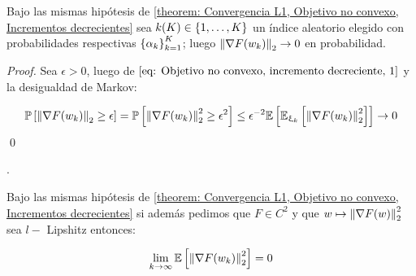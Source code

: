 \begin{corollary}
	Bajo las mismas hip\'otesis de \ref{theorem: Convergencia L1, Objetivo no convexo, Incrementos decrecientes} sea $k(K) \in \left\lbrace1, \dots, K\right\rbrace$ un \'indice aleatorio elegido con probabilidades respectivas $\left\lbrace\alpha_k\right\rbrace_{k=1}^K$; luego $\left\lVert\nabla F(w_k)\right\rVert_2 \rightarrow 0$ en probabilidad.
\end{corollary}

\begin{proof}
	Sea $\epsilon > 0$, luego de $\ref{eq: Objetivo no convexo, incremento decreciente, 1}$ y la desigualdad de Markov:
	
	
	\begin{equation*}
		\mathbb{P} \left[\left\lVert\nabla F (w_k)\right\rVert_2 \geq \epsilon\right] = \mathbb{P} \left[\left\lVert\nabla F (w_k)\right\rVert_2^2 \geq \epsilon^2\right] \leq \epsilon^{-2} \mathbb{E} \left[\mathbb{E}_{\upxi_{k}} \left[\left\lVert\nabla F(w_k)\right\rVert_2^2\right]\right]  \rightarrow 0
	\end{equation*}
	 \qed
	
\end{proof}.

\begin{theorem}
	Bajo las mismas hip\'otesis de \ref{theorem: Convergencia L1, Objetivo no convexo, Incrementos decrecientes} si adem\'as pedimos que $F \in C^2$ y que $w \mapsto \left\lVert\nabla F (w)\right\rVert_2^2$ sea $l-$ Lipshitz entonces:
	
	\begin{equation}
		\lim\limits_{k \rightarrow \infty} \mathbb{E} \left[\left\lVert\nabla F (w_k)\right\rVert_2^2\right] = 0
	\end{equation}
	
\end{theorem}

